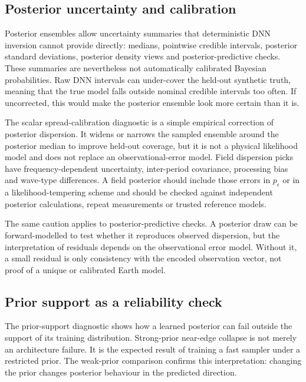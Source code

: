 \documentclass[referee]{gji}
\begin{document}
\subsection{Posterior uncertainty and calibration}

Posterior ensembles allow uncertainty summaries that deterministic DNN inversion cannot provide directly: medians, pointwise credible intervals, posterior standard deviations, posterior density views and posterior-predictive checks. These summaries are nevertheless not automatically calibrated Bayesian probabilities. Raw DNN intervals can under-cover the held-out synthetic truth, meaning that the true model falls outside nominal credible intervals too often. If uncorrected, this would make the posterior ensemble look more certain than it is.

The scalar spread-calibration diagnostic is a simple empirical correction of posterior dispersion. It widens or narrows the sampled ensemble around the posterior median to improve held-out coverage, but it is not a physical likelihood model and does not replace an observational-error model. Field dispersion picks have frequency-dependent uncertainty, inter-period covariance, processing bias and wave-type differences. A field posterior should include those errors in $p_\epsilon$ or in a likelihood-tempering scheme and should be checked against independent posterior calculations, repeat measurements or trusted reference models.

The same caution applies to posterior-predictive checks. A posterior draw can be forward-modelled to test whether it reproduces observed dispersion, but the interpretation of residuals depends on the observational error model. Without it, a small residual is only consistency with the encoded observation vector, not proof of a unique or calibrated Earth model.

\subsection{Prior support as a reliability check}

The prior-support diagnostic shows how a learned posterior can fail outside the support of its training distribution. Strong-prior near-edge collapse is not merely an architecture failure. It is the expected result of training a fast sampler under a restricted prior. The weak-prior comparison confirms this interpretation: changing the prior changes posterior behaviour in the predicted direction.
\end{document}
